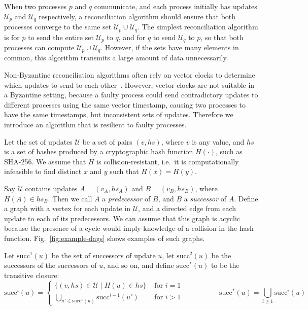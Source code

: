 \documentclass[a4paper,anonymous,USenglish]{lipics-v2019}
\begin{document}
When two processes $p$ and $q$ communicate, and each process initially has updates $\mathcal{U}_p$ and $\mathcal{U}_q$ respectively, a reconciliation algorithm should ensure that both processes converge to the same set $\mathcal{U}_p \cup \mathcal{U}_q$.
The simplest reconciliation algorithm is for $p$ to send the entire set $\mathcal{U}_p$ to $q$, and for $q$ to send $\mathcal{U}_q$ to $p$, so that both processes can compute $\mathcal{U}_p \cup \mathcal{U}_q$.
However, if the sets have many elements in common, this algorithm transmits a large amount of data unnecessarily.

Non-Byzantine reconciliation algorithms often rely on vector clocks to determine which updates to send to each other~\cite{Schwarz:1994}.
However, vector clocks are not suitable in a Byzantine setting, because a faulty process could send contradictory updates to different processes using the same vector timestamp, causing two processes to have the same timestamps, but inconsistent sets of updates.
Therefore we introduce an algorithm that is resilient to faulty processes.

Let the set of updates $\mathcal{U}$ be a set of pairs $(v, \mathit{hs})$, where $v$ is any value, and $\mathit{hs}$ is a set of hashes produced by a cryptographic hash function $H(\cdot)$, such as SHA-256.
We assume that $H$ is collision-resistant, i.e.\ it is computationally infeasible to find distinct $x$ and $y$ such that $H(x) = H(y)$.

Say $\mathcal{U}$ contains updates $A = (v_A, \mathit{hs}_A)$ and $B = (v_B, \mathit{hs}_B)$, where $H(A) \in \mathit{hs}_B$.
Then we call $A$ a \emph{predecessor} of $B$, and $B$ a \emph{successor} of $A$.
Define a graph with a vertex for each update in $\mathcal{U}$, and a directed edge from each update to each of its predecessors.
We can assume that this graph is acyclic because the presence of a cycle would imply knowledge of a collision in the hash function.
Fig.~\ref{fig:example-dags} shows examples of such graphs.

Let $\mathrm{succ}^1(u)$ be the set of successors of update $u$, let $\mathrm{succ}^2(u)$ be the successors of the successors of $u$, and so on, and define $\mathrm{succ}^*(u)$ to be the transitive closure:
\[
\mathrm{succ}^i(u) =
\begin{cases}
\{( v, \mathit{hs}) \in \mathcal{U} \mid H(u) \in \mathit{hs}\} & \text{ for } i=1 \\
\bigcup_{u' \in \mathrm{succ}^1(u)} \mathrm{succ}^{i-1}(u') & \text{ for } i>1
\end{cases}
\hspace{60pt}
\mathrm{succ}^*(u) = \bigcup_{i \ge 1} \mathrm{succ}^i(u)
\]
\end{document}
